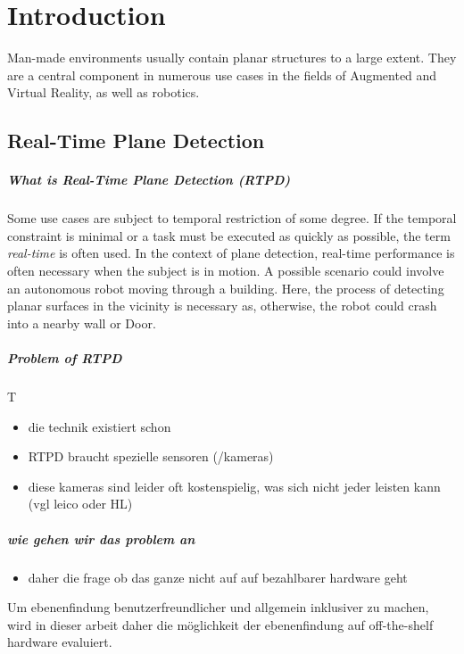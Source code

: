 \documentclass[main.tex]{subfiles}
\begin{document}
\chapter{Introduction}\label{chap:Introduction}

Man-made environments usually contain planar structures to a large extent.
They are a central component in numerous use cases in the fields of Augmented and Virtual Reality, as well as robotics.


\section{Real-Time Plane Detection}
\paragraph*{What is Real-Time Plane Detection (RTPD)}
Some use cases are subject to temporal restriction of some degree. If the temporal constraint is minimal or a task must be executed as quickly as possible, the term \textit{real-time} is often used. 
In the context of plane detection, real-time performance is often necessary when the subject is in motion. 
A possible scenario could involve an autonomous robot moving through a building. Here, the process of detecting planar surfaces in the vicinity is necessary as, otherwise, the robot could crash into a nearby wall or Door.

\paragraph*{Problem of RTPD}
T\begin{itemize}
    \item die technik existiert schon
    \item RTPD braucht spezielle sensoren (/kameras)
    \item diese kameras sind leider oft kostenspielig, was sich nicht jeder leisten kann (vgl leico oder HL)
\end{itemize}

\paragraph*{wie gehen wir das problem an}
\begin{itemize}
    \item daher die frage ob das ganze nicht auf auf bezahlbarer hardware geht
\end{itemize}
Um ebenenfindung benutzerfreundlicher und allgemein inklusiver zu machen, wird in dieser
arbeit daher die möglichkeit der ebenenfindung auf off-the-shelf hardware evaluiert.
\end{document}
